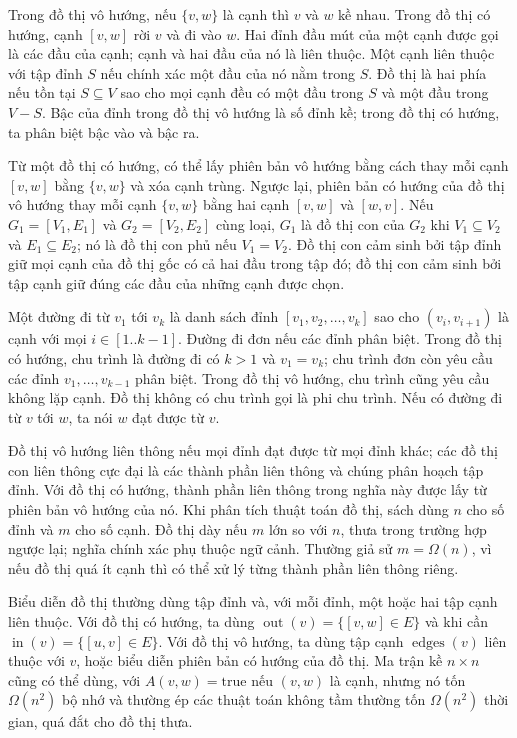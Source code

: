 \documentclass[11pt]{article}
\begin{document}
Trong đồ thị vô hướng, nếu \(\{v,w\}\) là cạnh thì \(v\) và \(w\) kề nhau. Trong
đồ thị có hướng, cạnh \([v,w]\) rời \(v\) và đi vào \(w\). Hai đỉnh đầu mút của
một cạnh được gọi là các đầu của cạnh; cạnh và hai đầu của nó là liên thuộc.
Một cạnh liên thuộc với tập đỉnh \(S\) nếu chính xác một đầu của nó nằm trong
\(S\). Đồ thị là hai phía nếu tồn tại \(S\subseteq V\) sao cho mọi cạnh đều có
một đầu trong \(S\) và một đầu trong \(V-S\). Bậc của đỉnh trong đồ thị vô hướng
là số đỉnh kề; trong đồ thị có hướng, ta phân biệt bậc vào và bậc ra.

Từ một đồ thị có hướng, có thể lấy phiên bản vô hướng bằng cách thay mỗi cạnh
\([v,w]\) bằng \(\{v,w\}\) và xóa cạnh trùng. Ngược lại, phiên bản có hướng của
đồ thị vô hướng thay mỗi cạnh \(\{v,w\}\) bằng hai cạnh \([v,w]\) và \([w,v]\).
Nếu \(G_1=[V_1,E_1]\) và \(G_2=[V_2,E_2]\) cùng loại, \(G_1\) là đồ thị con của
\(G_2\) khi \(V_1\subseteq V_2\) và \(E_1\subseteq E_2\); nó là đồ thị con phủ
nếu \(V_1=V_2\). Đồ thị con cảm sinh bởi tập đỉnh giữ mọi cạnh của đồ thị gốc có
cả hai đầu trong tập đó; đồ thị con cảm sinh bởi tập cạnh giữ đúng các đầu của
những cạnh được chọn.

Một đường đi từ \(v_1\) tới \(v_k\) là danh sách đỉnh
\([v_1,v_2,\ldots,v_k]\) sao cho \((v_i,v_{i+1})\) là cạnh với mọi
\(i\in[1..k-1]\). Đường đi đơn nếu các đỉnh phân biệt. Trong đồ thị có hướng,
chu trình là đường đi có \(k>1\) và \(v_1=v_k\); chu trình đơn còn yêu cầu các
đỉnh \(v_1,\ldots,v_{k-1}\) phân biệt. Trong đồ thị vô hướng, chu trình cũng
yêu cầu không lặp cạnh. Đồ thị không có chu trình gọi là phi chu trình. Nếu có
đường đi từ \(v\) tới \(w\), ta nói \(w\) đạt được từ \(v\).

Đồ thị vô hướng liên thông nếu mọi đỉnh đạt được từ mọi đỉnh khác; các đồ thị
con liên thông cực đại là các thành phần liên thông và chúng phân hoạch tập
đỉnh. Với đồ thị có hướng, thành phần liên thông trong nghĩa này được lấy từ
phiên bản vô hướng của nó. Khi phân tích thuật toán đồ thị, sách dùng \(n\) cho
số đỉnh và \(m\) cho số cạnh. Đồ thị dày nếu \(m\) lớn so với \(n\), thưa trong
trường hợp ngược lại; nghĩa chính xác phụ thuộc ngữ cảnh. Thường giả sử
\(m=\Omega(n)\), vì nếu đồ thị quá ít cạnh thì có thể xử lý từng thành phần
liên thông riêng.

Biểu diễn đồ thị thường dùng tập đỉnh và, với mỗi đỉnh, một hoặc hai tập cạnh
liên thuộc. Với đồ thị có hướng, ta dùng
\(\operatorname{out}(v)=\{[v,w]\in E\}\) và khi cần
\(\operatorname{in}(v)=\{[u,v]\in E\}\). Với đồ thị vô hướng, ta dùng tập cạnh
\(\operatorname{edges}(v)\) liên thuộc với \(v\), hoặc biểu diễn phiên bản có
hướng của đồ thị. Ma trận kề \(n\times n\) cũng có thể dùng, với
\(A(v,w)=\text{true}\) nếu \((v,w)\) là cạnh, nhưng nó tốn \(\Omega(n^2)\) bộ
nhớ và thường ép các thuật toán không tầm thường tốn \(\Omega(n^2)\) thời gian,
quá đắt cho đồ thị thưa.
\end{document}
